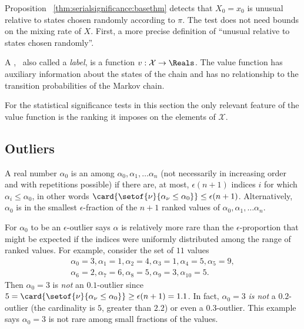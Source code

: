 \documentclass[12pt]{article}
\begin{document}
Proposition~%
\ref{thm:serialsignificance:basethm} detects that \( X_0 = x_0 \) is
unusual relative to states chosen randomly according to \( \pi \).  The
test does not need bounds on the mixing rate of \( X \).  First, a more
precise definition of ``unusual relative to states chosen randomly''.

\begin{definition}
    A ,~%
    also called a \emph{label}, is a function \( v :  \mathcal{X} \to
    \Reals \).  The value function has auxiliary information about the
    states of the chain and has no relationship to the transition
    probabilities of the Markov chain.
\end{definition}

\begin{remark}
    For the statistical significance tests in this section the only
    relevant feature of the value function is the ranking it imposes on
    the elements of \( \mathcal{X} \).
\end{remark}

\subsection*{Outliers}

\begin{definition}
    A real number \( \alpha_0 \) is an %
    among \( \alpha_0, \alpha_1, \dots \alpha_n \) (not necessarily in
    increasing order and with repetitions possible) if there are, at
    most, \( \epsilon(n + 1) \) indices \( i \) for which \( \alpha_i
    \le \alpha_0 \), in other words \( \card{%
    \setof{\nu}{\alpha_{\nu} \le \alpha_0}} \le \epsilon(n+1) \).
    Alternatively, \( \alpha_0 \) is in the smallest \( \epsilon \)-fraction
    of the \( n + 1 \) ranked values of \( \alpha_0, \alpha_1, \dots
    \alpha_n \).
\end{definition}

\begin{remark}
    For \( \alpha_0 \) to be an \( \epsilon \)-outlier says \( \alpha \)
    is relatively more rare than the \( \epsilon \)-proportion that
    might be expected if the indices were uniformly distributed among
    the range of ranked values.  For example, consider the set of \( 11 \)
    values
    \begin{multline*}
        \alpha_0 = 3, \alpha_1 = 1, \alpha_2 = 4, \alpha_3 = 1, \alpha_4
        = 5, \alpha_5 = 9, \\
        \alpha_6 = 2, \alpha_7 = 6, \alpha_8 = 5, \alpha_9 = 3, \alpha_{10}
        = 5.
    \end{multline*}
    Then \( \alpha_0 = 3 \) is \emph{not} an \( 0.1 \)-outlier since \(
    5 = \card{%
    \setof{\nu}{\alpha_\nu \le \alpha_0}} \ge \epsilon(n+1) = 1.1 \). In
    fact, \( \alpha_0 = 3 \) \emph{is not} a \( 0.2 \)-outlier (the
    cardinality is \( 5 \), greater than \( 2.2 \)) or even a \( 0.3 \)-outlier.
    This example says \( \alpha_0 = 3 \) is not rare among small
    fractions of the values.
\end{remark}
\end{document}
